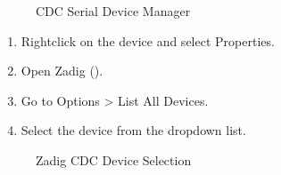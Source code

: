 \documentclass[letterpaper,10pt,english]{sphinxmanual}
\begin{document}
\begin{figure}[htbp]
\centering
\capstart

\noindent{}
\caption{CDC Serial Device Manager}\label{\detokenize{cdc:id1}}\label{\detokenize{cdc:figura-device-manager}}\end{figure}
\begin{enumerate}
%
\setcounter{enumi}{1}
\item {} 
\sphinxAtStartPar
Right\sphinxhyphen{}click on the device and select Properties.

\item {} 
\sphinxAtStartPar
Open Zadig ().

\item {} 
\sphinxAtStartPar
Go to Options \textgreater{} List All Devices.

\item {} 
\sphinxAtStartPar
Select the device from the drop\sphinxhyphen{}down list.

\end{enumerate}

\begin{figure}[htbp]
\centering
\capstart

\noindent{}
\caption{Zadig CDC Device Selection}\label{\detokenize{cdc:id2}}\label{\detokenize{cdc:figura-zadig}}\end{figure}



\renewcommand{\indexname}{Index}
\printindex
\end{document}
